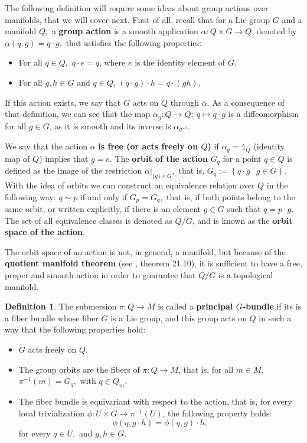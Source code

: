 \documentclass[12pt, letterpaper, reqno]{amsart}
\theoremstyle{definition}
\newtheorem{df}{Definition}
\theoremstyle{plain}
\theoremstyle{remark}
\begin{document}
The following definition will require some ideas about group actions over manifolds, that we will cover next. First of all, recall that for a Lie group $ G $ and a manifold $ Q, $ a \textbf{group action} is a smooth application $ \alpha:  Q\times G \rightarrow Q $, denoted by $ \alpha(q,g) = q \cdot g, $ that satisfies the following properties:

\begin{itemize}
	\item For all $ q\in Q, $ $ q\cdot e = q $, where $ e $ is the identity element of $ G. $   
	\item For all $ g,h\in G $ and $ q\in Q $, $ (q\cdot g) \cdot h =q\cdot(gh). $ 
\end{itemize}

If this action exists, we say that $ G $ acts on $ Q $ through $ \alpha. $ As a consequence of that definition, we can see that the map $ \alpha_g: Q \rightarrow Q: \ q\mapsto q\cdot g$ is a diffeomorphism for all $ g\in G $, as it is smooth and its inverse is $ \alpha_{g^{-1}}. $

We say that the action $ \alpha $ \textbf{is free (or acts freely on $ Q $)} if $ \alpha_g = \mathbb{1}_{Q} $ (identity map of $ Q $) implies that $ g=e. $ The \textbf{orbit of the action} $ G_q $ for a point $ q\in Q $  is defined as the image of the restriction $\alpha|_{\{q\}\times G},$  that is, $ G_q := \left\{q\cdot g \ | \ g\in G \right\}. $ With the idea of orbits we can construct an equivalence relation over $ Q $ in the following way: $ q\sim p $ if and only if $ G_p = G_q, $ that is, if both points belong to the same orbit, or written explicitly, if there is an element $ g\in G $ such that $ q = p\cdot g. $ The set of all equivalence classes is denoted as $ Q/G $, and is known as the \textbf{orbit space of the action}.     

The orbit space of an action is not, in general, a manifold, but because of the \textbf{quotient manifold theorem} (see \cite{lee2003introduction}, theorem 21.10), it is sufficient to have a free, proper and smooth action in order to guarantee that $ Q/G $ is a topological manifold.

\begin{df}
	The submersion $ \pi: Q \rightarrow M$  is called a \textbf{principal $ G $-bundle} if its is a fiber bundle whose fiber $ G $ is a Lie group, and this group acts on $ Q $ in such a way that the following properties hold:
	\begin{itemize}
		\item $ G $ acts freely on $ Q $.
		\item The group orbits are the fibers of $ \pi:Q \rightarrow {M} $, that is, for all $ m\in M, $ $ \pi^{-1}(m) = G_q, $ with $ q\in Q_m. $ 
		\item The fiber bundle is equivariant with respect to the action, that is, for every local trivialization $ \phi: U \times G \rightarrow \pi^{-1}(U) $, the following property holds: $$ \phi(q, g\cdot h) = \phi(q,g)\cdot h,$$  
			for every $ q\in U, $ and $ g,h\in G. $ 
	\end{itemize}
\end{df}
\end{document}

